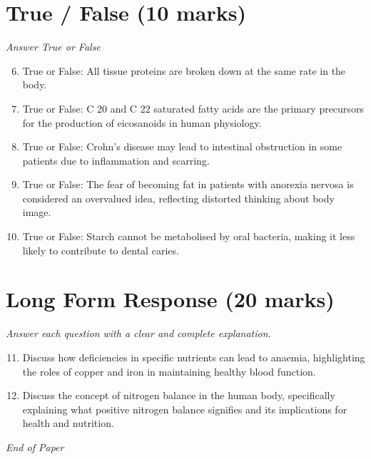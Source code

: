 \documentclass[12pt]{article}
\begin{document}
\section*{True / False (10 marks)}
\textit{Answer True or False}
\begin{enumerate}[label=\arabic*.]
\setcounter{enumi}{5}
\item True or False: All tissue proteins are broken down at the same rate in the body.
\item True or False: C 20 and C 22 saturated fatty acids are the primary precursors for the production of eicosanoids in human physiology.
\item True or False: Crohn's disease may lead to intestinal obstruction in some patients due to inflammation and scarring.
\item True or False: The fear of becoming fat in patients with anorexia nervosa is considered an overvalued idea, reflecting distorted thinking about body image.
\item True or False: Starch cannot be metabolised by oral bacteria, making it less likely to contribute to dental caries.
\end{enumerate}

\section*{Long Form Response (20 marks)}
\textit{Answer each question with a clear and complete explanation.}
\begin{enumerate}[label=\arabic*.]
\setcounter{enumi}{10}
\item Discuss how deficiencies in specific nutrients can lead to anaemia, highlighting the roles of copper and iron in maintaining healthy blood function.
\item Discuss the concept of nitrogen balance in the human body, specifically explaining what positive nitrogen balance signifies and its implications for health and nutrition.
\end{enumerate}

\vfill
\noindent\textit{End of Paper}
\end{document}

